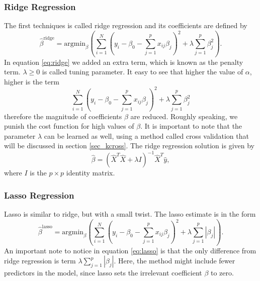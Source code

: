 \documentclass [11pt]{article}
\begin{document}
\subsubsection*{Ridge Regression}
The first techniques is called ridge regression and its coefficients are defined by 
\begin{equation}
\hat{\beta}^{\text{ridge}}=\text{argmin}_{\beta} ( \sum_{i=1}^{N}(y_{i}- \beta_{0}- \sum_{j=1}^{p}x_{ij}\beta_{j})^{2}+ \lambda \sum_{j=1}^{p} \beta_{j}^{2}).
\label{eq:ridge}
\end{equation}
In equation \eqref{eq:ridge} we added an extra term, which is known as the penalty term. $\lambda \geq 0$ is called tuning parameter. It easy to see that higher the value of $\alpha$, higher is the term 
\begin{equation*}
\sum_{i=1}^{N}(y_{i}- \beta_{0}- \sum_{j=1}^{p}x_{ij}\beta_{j})^{2}+ \lambda \sum_{j=1}^{p} \beta_{j}^{2}
\end{equation*}
therefore the magnitude of coefficients $\beta$ are reduced. Roughly speaking, we punish the cost function for high values of $\beta$. It is important to note that the parameter $\lambda$ can be learned as well, using a method called cross validation that will be discussed in section \ref{sec_kcross}.
The ridge regression solution is given by
\begin{equation}
\hat{\beta} =\left(\hat{X}^T\hat{X} + \lambda I \right)^{-1}\hat{X}^T\hat{y},
\end{equation}
where $I$ is the $p \times p$ identity matrix.
\subsubsection*{Lasso Regression}
Lasso is similar to ridge, but with a small twist. The lasso estimate is in the form
\begin{equation}
\hat{\beta}^{\text{lasso}}=\text{argmin}_{\beta} ( \sum_{i=1}^{N}(y_{i}- \beta_{0}- \sum_{j=1}^{p}x_{ij}\beta_{j})^{2}+ \lambda \sum_{j=1}^{p} |\beta_{j}|).
\label{eq:lasso}
\end{equation}
An important note to notice in equation \eqref{eq:lasso} is that the only difference from ridge regression is term $\lambda \sum_{j=1}^{p} |\beta_{j}|$. Here, the method might include fewer predictors in the model, since lasso sets the irrelevant coefficient $\beta$ to zero.
\end{document}
